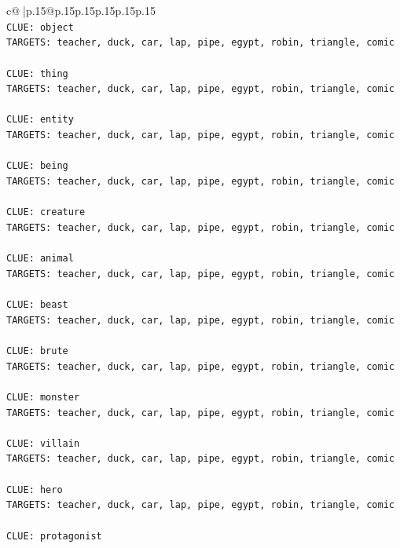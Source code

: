 \documentclass{article}
\begin{document}
{\begin{supertabular}{c@{$\;$}|p{.15\linewidth}@{}p{.15\linewidth}p{.15\linewidth}p{.15\linewidth}p{.15\linewidth}p{.15\linewidth}}
{{{\\ 
\texttt{CLUE: object} \\
\texttt{TARGETS: teacher, duck, car, lap, pipe, egypt, robin, triangle, comic} \\
\\ 
\texttt{CLUE: thing} \\
\texttt{TARGETS: teacher, duck, car, lap, pipe, egypt, robin, triangle, comic} \\
\\ 
\texttt{CLUE: entity} \\
\texttt{TARGETS: teacher, duck, car, lap, pipe, egypt, robin, triangle, comic} \\
\\ 
\texttt{CLUE: being} \\
\texttt{TARGETS: teacher, duck, car, lap, pipe, egypt, robin, triangle, comic} \\
\\ 
\texttt{CLUE: creature} \\
\texttt{TARGETS: teacher, duck, car, lap, pipe, egypt, robin, triangle, comic} \\
\\ 
\texttt{CLUE: animal} \\
\texttt{TARGETS: teacher, duck, car, lap, pipe, egypt, robin, triangle, comic} \\
\\ 
\texttt{CLUE: beast} \\
\texttt{TARGETS: teacher, duck, car, lap, pipe, egypt, robin, triangle, comic} \\
\\ 
\texttt{CLUE: brute} \\
\texttt{TARGETS: teacher, duck, car, lap, pipe, egypt, robin, triangle, comic} \\
\\ 
\texttt{CLUE: monster} \\
\texttt{TARGETS: teacher, duck, car, lap, pipe, egypt, robin, triangle, comic} \\
\\ 
\texttt{CLUE: villain} \\
\texttt{TARGETS: teacher, duck, car, lap, pipe, egypt, robin, triangle, comic} \\
\\ 
\texttt{CLUE: hero} \\
\texttt{TARGETS: teacher, duck, car, lap, pipe, egypt, robin, triangle, comic} \\
\\ 
\texttt{CLUE: protagonist} \\
}}}
\end{supertabular}}
\end{document}
